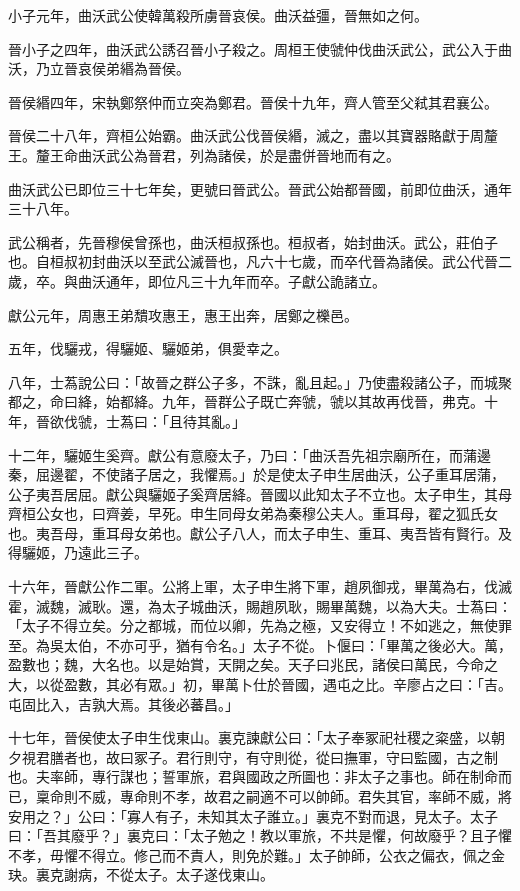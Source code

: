 \begin{pinyinscope}
小子元年，曲沃武公使韓萬殺所虜晉哀侯。曲沃益彊，晉無如之何。

晉小子之四年，曲沃武公誘召晉小子殺之。周桓王使虢仲伐曲沃武公，武公入于曲沃，乃立晉哀侯弟緡為晉侯。

晉侯緡四年，宋執鄭祭仲而立突為鄭君。晉侯十九年，齊人管至父弒其君襄公。

晉侯二十八年，齊桓公始霸。曲沃武公伐晉侯緡，滅之，盡以其寶器賂獻于周釐王。釐王命曲沃武公為晉君，列為諸侯，於是盡併晉地而有之。

曲沃武公已即位三十七年矣，更號曰晉武公。晉武公始都晉國，前即位曲沃，通年三十八年。

武公稱者，先晉穆侯曾孫也，曲沃桓叔孫也。桓叔者，始封曲沃。武公，莊伯子也。自桓叔初封曲沃以至武公滅晉也，凡六十七歲，而卒代晉為諸侯。武公代晉二歲，卒。與曲沃通年，即位凡三十九年而卒。子獻公詭諸立。

獻公元年，周惠王弟穨攻惠王，惠王出奔，居鄭之櫟邑。

五年，伐驪戎，得驪姬、驪姬弟，俱愛幸之。

八年，士蒍說公曰：「故晉之群公子多，不誅，亂且起。」乃使盡殺諸公子，而城聚都之，命曰絳，始都絳。九年，晉群公子既亡奔虢，虢以其故再伐晉，弗克。十年，晉欲伐虢，士蒍曰：「且待其亂。」

十二年，驪姬生奚齊。獻公有意廢太子，乃曰：「曲沃吾先祖宗廟所在，而蒲邊秦，屈邊翟，不使諸子居之，我懼焉。」於是使太子申生居曲沃，公子重耳居蒲，公子夷吾居屈。獻公與驪姬子奚齊居絳。晉國以此知太子不立也。太子申生，其母齊桓公女也，曰齊姜，早死。申生同母女弟為秦穆公夫人。重耳母，翟之狐氏女也。夷吾母，重耳母女弟也。獻公子八人，而太子申生、重耳、夷吾皆有賢行。及得驪姬，乃遠此三子。

十六年，晉獻公作二軍。公將上軍，太子申生將下軍，趙夙御戎，畢萬為右，伐滅霍，滅魏，滅耿。還，為太子城曲沃，賜趙夙耿，賜畢萬魏，以為大夫。士蒍曰：「太子不得立矣。分之都城，而位以卿，先為之極，又安得立！不如逃之，無使罪至。為吳太伯，不亦可乎，猶有令名。」太子不從。卜偃曰：「畢萬之後必大。萬，盈數也；魏，大名也。以是始賞，天開之矣。天子曰兆民，諸侯曰萬民，今命之大，以從盈數，其必有眾。」初，畢萬卜仕於晉國，遇屯之比。辛廖占之曰：「吉。屯固比入，吉孰大焉。其後必蕃昌。」

十七年，晉侯使太子申生伐東山。裏克諫獻公曰：「太子奉冢祀社稷之粢盛，以朝夕視君膳者也，故曰冢子。君行則守，有守則從，從曰撫軍，守曰監國，古之制也。夫率師，專行謀也；誓軍旅，君與國政之所圖也：非太子之事也。師在制命而已，稟命則不威，專命則不孝，故君之嗣適不可以帥師。君失其官，率師不威，將安用之？」公曰：「寡人有子，未知其太子誰立。」裏克不對而退，見太子。太子曰：「吾其廢乎？」裏克曰：「太子勉之！教以軍旅，不共是懼，何故廢乎？且子懼不孝，毋懼不得立。修己而不責人，則免於難。」太子帥師，公衣之偏衣，佩之金玦。裏克謝病，不從太子。太子遂伐東山。


\end{pinyinscope}
